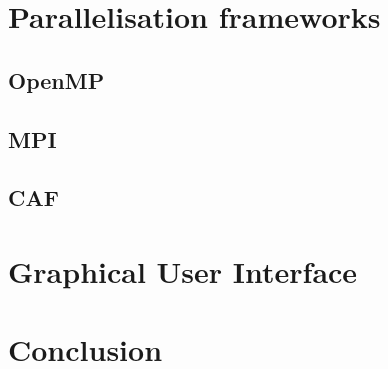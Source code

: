 \documentclass[12pt]{article}
\begin{document}
\newpage
\section{Parallelisation frameworks}	\label{sec:paralframew}
	\subsection{OpenMP}					\label{sec:openmp}				
	\subsection{MPI}					\label{sec:mpi}					
	\subsection{CAF}					\label{sec:caf}					

\newpage
\section{Graphical User Interface}		\label{sec:gui}					

\newpage
	\section{Conclusion}				\label{sec:conclusion}			
\newpage

%
%
\end{document}
